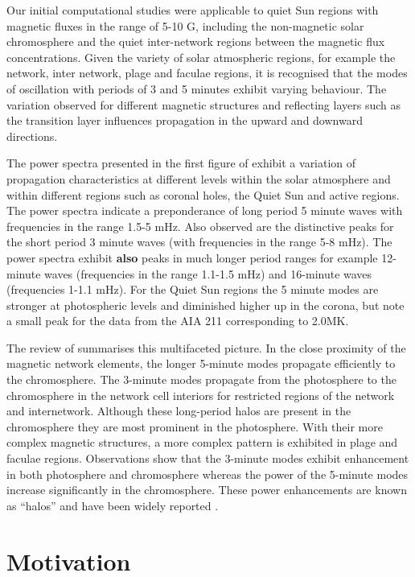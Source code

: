 \documentclass[physics,article,submit,pdftex,moreauthors]{Definitions/mdpi}
\begin{document}
Our initial computational studies were applicable to quiet Sun regions with magnetic fluxes in the range of 5-10 G, including the non-magnetic solar chromosphere and the quiet inter-network regions between the magnetic flux concentrations. Given the variety of solar atmospheric regions, for example the network, inter network, plage and faculae regions, it is recognised that the modes of oscillation with periods of 3 and 5 minutes exhibit varying behaviour. The variation observed for different magnetic structures and reflecting layers such as the transition layer influences propagation in the upward and downward directions.


The power spectra presented in the first figure of \citet{Griffiths2018b} exhibit a variation of propagation characteristics at different levels within the solar atmosphere and within different regions such as coronal holes, the Quiet Sun and active regions. The power spectra indicate a preponderance of long period 5 minute waves with frequencies in the range 1.5-5 mHz. Also observed are the distinctive peaks for the short period 3 minute waves (with frequencies in the range 5-8 mHz). The power spectra exhibit {\bf also} peaks in much longer period ranges for example 12-minute waves  (frequencies in the range 1.1-1.5 mHz)  and 16-minute waves (frequencies 1-1.1 mHz). For the Quiet Sun regions the 5 minute modes are stronger at photospheric levels and diminished higher up in the corona, but note a small peak for the data from the AIA 211 corresponding to 2.0MK. 



The review of \citet{Khomenko2013} summarises this multifaceted picture. In the close proximity of the magnetic network elements, the longer 5-minute modes propagate efficiently to the chromosphere. The 3-minute modes propagate from the photosphere to the chromosphere in the network cell interiors for restricted regions of the network and internetwork. Although these long-period halos are present in the chromosphere they are most prominent in the photosphere. With their more complex magnetic structures, a more complex pattern is exhibited in plage and faculae regions. Observations show that the 3-minute modes exhibit enhancement in both photosphere and chromosphere whereas the power of the 5-minute modes increase significantly in the chromosphere. These power enhancements are known as “halos” and have been widely reported \citet{Kontogiannis2010}. 

\section{Motivation}
\label{sec:motivation}
\end{document}
